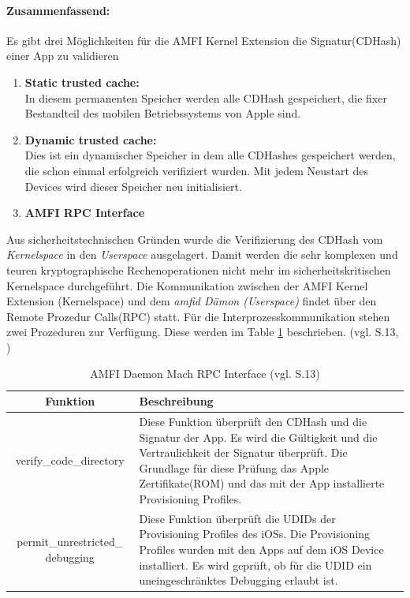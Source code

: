 \paragraph{Zusammenfassend:} Es gibt drei Möglichkeiten für die AMFI Kernel Extension die Signatur(CDHash) einer App zu validieren
\begin{enumerate}
    \item \textbf{Static trusted cache:} \\
    In diesem permanenten Speicher werden alle CDHash gespeichert, die fixer Bestandteil des mobilen Betriebssystems von Apple sind.  
    \item \textbf{Dynamic trusted cache:} \\
    Dies ist ein dynamischer Speicher in dem alle CDHashes gespeichert werden, die schon einmal erfolgreich verifiziert wurden. Mit jedem Neustart des Devices wird dieser Speicher neu initialisiert.
    \item \textbf{AMFI RPC Interface} 
\end{enumerate}   
  
 Aus sicherheitstechnischen Gründen wurde die Verifizierung des CDHash vom \textit{\glqq Kernelspace\grqq{}} in den \textit{\glqq Userspace\grqq{}} ausgelagert. Damit werden die sehr komplexen und teuren kryptographische Rechenoperationen nicht mehr im sicherheitskritischen Kernelspace durchgeführt. Die Kommunikation zwischen der AMFI Kernel Extension (Kernelspace) und dem \textit{\glqq amfid Dämon (Userspace)\grqq{}} findet über den Remote Prozedur Calls(RPC) statt. Für die Interprozesskommunikation stehen zwei Prozeduren zur Verfügung. Diese werden im Table \ref{tab:AMFID} beschrieben. (vgl. \cite{iOSSec[5]} S.13, \cite{Mach[1]}) 

\begin{table}[ht]
\begin{center}
\begin{tabular}{|c|p{}|} \hline
  Funktion & Beschreibung\\ \hline
verify\_code\_directory &  
Diese Funktion überprüft den CDHash und die Signatur der App. Es wird die Gültigkeit und die Vertraulichkeit der Signatur überprüft. Die Grundlage für diese Prüfung das Apple Zertifikate(ROM) und das mit der App installierte Provisioning Profiles.\\ \hline

permit\_unrestricted\_ debugging &  
Diese Funktion überprüft die UDIDs der Provisioning Profiles des iOSs. Die Provisioning Profiles wurden mit den Apps auf dem iOS Device installiert. Es wird geprüft, ob für die UDID ein uneingeschränktes Debugging erlaubt ist. \\ \hline
\end{tabular} 
\caption{AMFI Daemon Mach RPC Interface (vgl. \cite{iOSSec[5]} S.13)}
\label{tab:AMFID}
\end{center}
\end{table}

